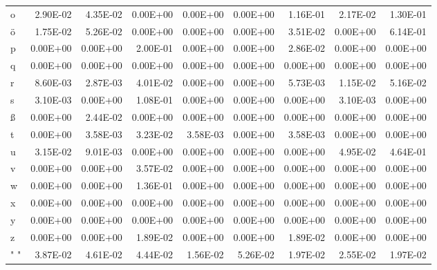 \documentclass[11pt,a4paper]{CLabBookTemplate} %
\begin{document}
\begin{table}[htbp]
\begin{tabular}{lrrrrrrrr}
		o     & 2.90E-02 & 4.35E-02 & 0.00E+00 & 0.00E+00 & 0.00E+00 & 1.16E-01 & 2.17E-02 & 1.30E-01 \\
		ö     & 1.75E-02 & 5.26E-02 & 0.00E+00 & 0.00E+00 & 0.00E+00 & 3.51E-02 & 0.00E+00 & 6.14E-01 \\
		p     & 0.00E+00 & 0.00E+00 & 2.00E-01 & 0.00E+00 & 0.00E+00 & 2.86E-02 & 0.00E+00 & 0.00E+00 \\
		q     & 0.00E+00 & 0.00E+00 & 0.00E+00 & 0.00E+00 & 0.00E+00 & 0.00E+00 & 0.00E+00 & 0.00E+00 \\
		r     & 8.60E-03 & 2.87E-03 & 4.01E-02 & 0.00E+00 & 0.00E+00 & 5.73E-03 & 1.15E-02 & 5.16E-02 \\
		s     & 3.10E-03 & 0.00E+00 & 1.08E-01 & 0.00E+00 & 0.00E+00 & 0.00E+00 & 3.10E-03 & 0.00E+00 \\
		ß     & 0.00E+00 & 2.44E-02 & 0.00E+00 & 0.00E+00 & 0.00E+00 & 0.00E+00 & 0.00E+00 & 0.00E+00 \\
		t     & 0.00E+00 & 3.58E-03 & 3.23E-02 & 3.58E-03 & 0.00E+00 & 3.58E-03 & 0.00E+00 & 0.00E+00 \\
		u     & 3.15E-02 & 9.01E-03 & 0.00E+00 & 0.00E+00 & 0.00E+00 & 0.00E+00 & 4.95E-02 & 4.64E-01 \\
		v     & 0.00E+00 & 0.00E+00 & 3.57E-02 & 0.00E+00 & 0.00E+00 & 0.00E+00 & 0.00E+00 & 0.00E+00 \\
		w     & 0.00E+00 & 0.00E+00 & 1.36E-01 & 0.00E+00 & 0.00E+00 & 0.00E+00 & 0.00E+00 & 0.00E+00 \\
		x     & 0.00E+00 & 0.00E+00 & 0.00E+00 & 0.00E+00 & 0.00E+00 & 0.00E+00 & 0.00E+00 & 0.00E+00 \\
		y     & 0.00E+00 & 0.00E+00 & 0.00E+00 & 0.00E+00 & 0.00E+00 & 0.00E+00 & 0.00E+00 & 0.00E+00 \\
		z     & 0.00E+00 & 0.00E+00 & 1.89E-02 & 0.00E+00 & 0.00E+00 & 1.89E-02 & 0.00E+00 & 0.00E+00 \\
		" "   & 3.87E-02 & 4.61E-02 & 4.44E-02 & 1.56E-02 & 5.26E-02 & 1.97E-02 & 2.55E-02 & 1.97E-02 \\
	\end{tabular}%
	\label{tab:ProbTrans2}%
\end{table}%
\end{document}
